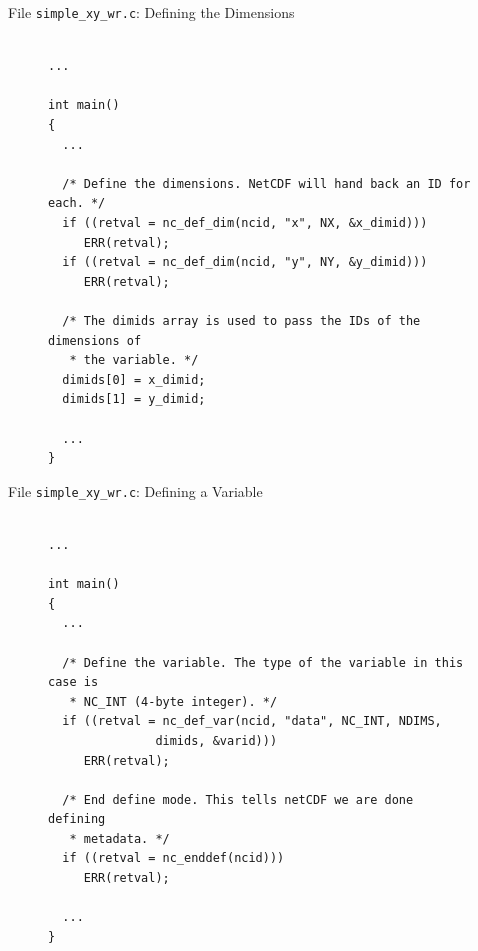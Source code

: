 \documentclass[compress,11pt,xcolor=svgnames,aspectratio=169]{beamer}
\begin{document}
\begin{frame}[fragile]{File \texttt{simple\_xy\_wr.c}: Defining the Dimensions}

\begin{figure}
\centering
\begin{varwidth}{\linewidth}
{\tiny

\begin{verbatim}

...

int main()
{
  ...

  /* Define the dimensions. NetCDF will hand back an ID for each. */
  if ((retval = nc_def_dim(ncid, "x", NX, &x_dimid)))
     ERR(retval);
  if ((retval = nc_def_dim(ncid, "y", NY, &y_dimid)))
     ERR(retval);

  /* The dimids array is used to pass the IDs of the dimensions of
   * the variable. */
  dimids[0] = x_dimid;
  dimids[1] = y_dimid;

  ...
}

\end{verbatim}

}
\end{varwidth}
\end{figure}

\end{frame}

\begin{frame}[fragile]{File \texttt{simple\_xy\_wr.c}: Defining a Variable}

\begin{figure}
\centering
\begin{varwidth}{\linewidth}
{\tiny

\begin{verbatim}

...

int main()
{
  ...

  /* Define the variable. The type of the variable in this case is
   * NC_INT (4-byte integer). */
  if ((retval = nc_def_var(ncid, "data", NC_INT, NDIMS,
               dimids, &varid)))
     ERR(retval);

  /* End define mode. This tells netCDF we are done defining
   * metadata. */
  if ((retval = nc_enddef(ncid)))
     ERR(retval);

  ...
}

\end{verbatim}

}
\end{varwidth}
\end{figure}

\end{frame}
\end{document}
